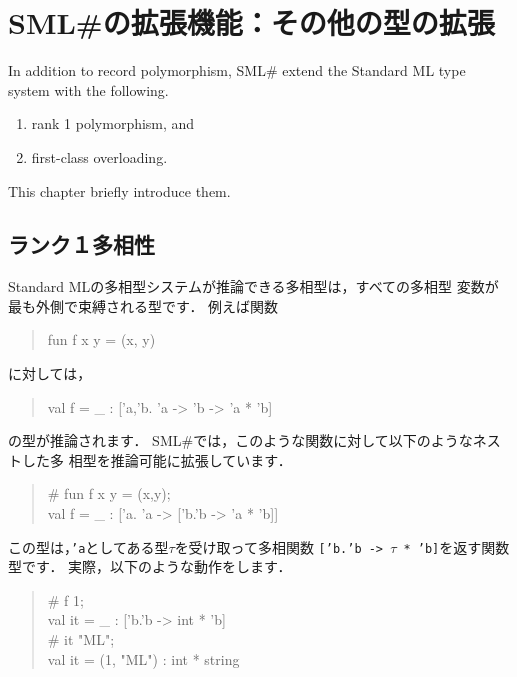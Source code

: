 \documentclass{jbook}
\newif\ifjp
\newcommand{\txt}[2]{#1}
\newcommand{\smlsharp}{SML\#}
\newenvironment{program}{\begin{quote}\begin{tt}}%
                        {\end{tt}\end{quote}}
\begin{document}
\chapter{
\txt{\smlsharp{}の拡張機能：その他の型の拡張}
    {\smlsharp{} feature：other type system extensions}}
\label{chap:tutorialOthertyping}

\ifjp%
	\smlsharp{}では，レコード多相性に加え，以下の２つの拡張をしてい
ます．
\begin{enumerate}
\item ランク１多相性
\item 第一級のオーバーローディング
\end{enumerate}
	本章では，これら機能を簡単に説明します．
\else%
	In addition to record polymorphism, \smlsharp{} extend the Standard
ML type system  with the following.
\begin{enumerate}
\item rank 1 polymorphism, and
\item first-class overloading.
\end{enumerate}
	This chapter briefly introduce them.
\fi%

\section{\txt{ランク１多相性}{Rank 1 polymorphism}}
\label{sec:extensionRank1}

\ifjp%
	Standard MLの多相型システムが推論できる多相型は，すべての多相型
変数が最も外側で束縛される型です．
	例えば関数
\begin{program}
fun f x y = (x, y)
\end{program}
に対しては，
\begin{program}
val f = \_ : ['a,'b. 'a -> 'b -> 'a * 'b]
\end{program}
の型が推論されます．
	\smlsharp{}では，このような関数に対して以下のようなネストした多
相型を推論可能に拡張しています．
\begin{program}
\# fun f x y = (x,y);\\
val f = \_ : ['a. 'a -> ['b.'b -> 'a * 'b]]
\end{program}
	この型は，{\tt 'a}としてある型$\tau$を受け取って多相関数
{\tt ['b.'b -> $\tau$ * 'b]}を返す関数型です．
	実際，以下のような動作をします．
\begin{program}
\# f 1;\\
val it = \_ : ['b.'b -> int * 'b]\\
\# it "ML";\\
val it = (1, "ML") : int * string
\end{program}
\end{document}
